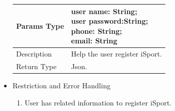 \documentclass[16pt]{scrreprt}
\begin{document}
\begin{itemize}
\begin{center}
\begin{tabular}{p{5cm}p{10cm}}
        \hline
        Params Type & \makecell[l]{user name: String;\\user password:String;\\ phone: String;\\email: String}\\
        \hline
        Description & Help the user register iSport.\\
        \hline
        Return Type & Json.\\
        \hline
    \end{tabular}
\end{center}
\item Restriction and Error Handling\\
\begin{enumerate}
	\item User has related information to register iSport.
\end{enumerate} 
\end{itemize}
\end{document}
